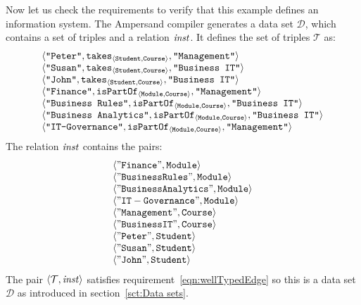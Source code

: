 \documentclass[runningheads]{llncs}
\newcommand{\id}[1]{\text{\it #1\/}}
\newcommand{\instance}{\mathbin{\id{inst}}}
\newcommand{\declare}[3]{\id{#1}_{\pair{#2}{#3}}}
\newcommand{\pair}[2]{\langle{#1},{#2}\rangle}
\newcommand{\triple}[3]{\langle{#1},{#2},{#3}\rangle}
\newcommand{\triples}{\mathcal{T}}
\newcommand{\dataset}{\mathscr{D}}
\begin{document}
   Now let us check the requirements to verify that this example defines an information system.
   The Ampersand compiler generates a data set $\dataset$, which contains a set of triples and a relation $\instance$.
   It defines the set of triples $\triples$ as:
\[\begin{array}[t]{l}
   \triple{\text{\tt "Peter"}}{\declare{\text{\tt takes}}{\text{\tt Student}}{\text{\tt Course}}}{\text{\tt "Management"}}\\
   \triple{\text{\tt "Susan"}}{\declare{\text{\tt takes}}{\text{\tt Student}}{\text{\tt Course}}}{\text{\tt "Business IT"}}\\
   \triple{\text{\tt "John"}}{\declare{\text{\tt takes}}{\text{\tt Student}}{\text{\tt Course}}}{\text{\tt "Business IT"}}\\
   \triple{\text{\tt "Finance"}}{\declare{\text{\tt isPartOf}}{\text{\tt Module}}{\text{\tt Course}}}{\text{\tt "Management"}}\\
   \triple{\text{\tt "Business Rules"}}{\declare{\text{\tt isPartOf}}{\text{\tt Module}}{\text{\tt Course}}}{\text{\tt "Business IT"}}\\
   \triple{\text{\tt "Business Analytics"}}{\declare{\text{\tt isPartOf}}{\text{\tt Module}}{\text{\tt Course}}}{\text{\tt "Business IT"}}\\
   \triple{\text{\tt "IT-Governance"}}{\declare{\text{\tt isPartOf}}{\text{\tt Module}}{\text{\tt Course}}}{\text{\tt "Management"}}
\end{array}\]
The relation $\instance$ contains the pairs:
\[\begin{array}{l}
   \pair{\tt "Finance"}{\tt Module}\\
   \pair{\tt "Business Rules"}{\tt Module}\\
   \pair{\tt "Business Analytics"}{\tt Module}\\
   \pair{\tt "IT-Governance"}{\tt Module}\\
   \pair{\tt "Management"}{\tt Course}\\
   \pair{\tt "Business IT"}{\tt Course}\\
   \pair{\tt "Peter"}{\tt Student}\\
   \pair{\tt "Susan"}{\tt Student}\\
   \pair{\tt "John"}{\tt Student}
\end{array}\]
   The pair $\pair{\triples}{\instance}$ satisfies requirement~\ref{eqn:wellTypedEdge} so this is a data set $\dataset$ as introduced in section~\ref{sct:Data sets}.
\end{document}
